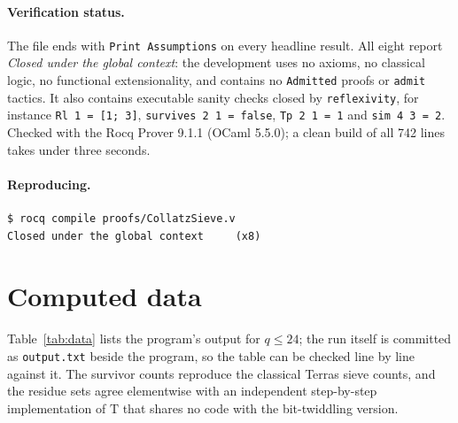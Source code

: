 \documentclass[11pt,a4paper]{article}
\theoremstyle{plain}
\theoremstyle{definition}
\newcommand{\Tmap}{\mathrm{T}}
\begin{document}
\paragraph{Verification status.}
The file ends with \texttt{Print Assumptions} on every headline result. All
eight report \emph{Closed under the global context}: the development uses no
axioms, no classical logic, no functional extensionality, and contains no
\texttt{Admitted} proofs or \texttt{admit} tactics. It also contains
executable sanity checks closed by \texttt{reflexivity}, for instance
\texttt{Rl 1 = [1; 3]}, \texttt{survives 2 1 = false}, \texttt{Tp 2 1 = 1} and
\texttt{sim 4 3 = 2}. Checked with the Rocq Prover 9.1.1 (OCaml 5.5.0); a
clean build of all 742 lines takes under three seconds.

\paragraph{Reproducing.}
\begin{lstlisting}[style=rocq,numbers=none]
$ rocq compile proofs/CollatzSieve.v
Closed under the global context     (x8)
\end{lstlisting}

\section{Computed data}
\label{sec:data}

Table~\ref{tab:data} lists the program's output for $q \leq 24$; the run itself
is committed as \texttt{output.txt} beside the program, so the table can be
checked line by line against it. The survivor counts reproduce the classical
Terras sieve counts, and the residue sets agree elementwise with an
independent step-by-step implementation of $\Tmap$ that shares no code with
the bit-twiddling version.
\end{document}
